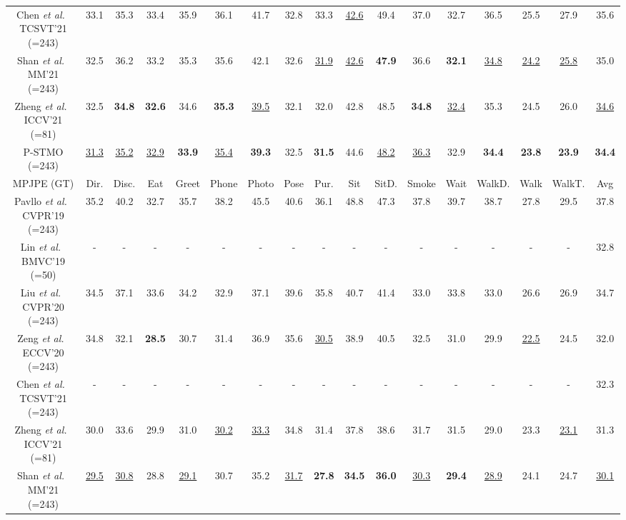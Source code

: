 \documentclass[]{llncs}
\begin{document}
\begin{table}[t]
\begin{center}
{\begin{tabular}{c|ccccccccccccccc|c}
Chen \textit{et al.}~\cite{chen2021anatomy} TCSVT'21 (=243)&
33.1&35.3&33.4&35.9&36.1&41.7&32.8&33.3&\underline{42.6}&49.4&37.0&32.7&36.5&25.5&27.9&35.6\\
Shan \textit{et al.}~\cite{shan2021improving} MM'21 (=243)&
32.5&36.2&33.2&35.3&35.6&42.1&32.6&\underline{31.9}&\underline{42.6}&\textbf{47.9}&36.6&\textbf{32.1}&\underline{34.8}&\underline{24.2}&\underline{25.8}&35.0\\
Zheng \textit{et al.}~\cite{zheng20213d} ICCV'21 (=81)&
32.5&\textbf{34.8}&\textbf{32.6}&34.6&\textbf{35.3}&\underline{39.5}&32.1&32.0&42.8&48.5&\textbf{34.8}&\underline{32.4}&35.3&24.5&26.0&\underline{34.6}\\

\noalign{\smallskip}
\hline
\noalign{\smallskip}
P-STMO (=243)  &
\underline{31.3}&\underline{35.2}&\underline{32.9}&\textbf{33.9}&\underline{35.4}&\textbf{39.3}&32.5&\textbf{31.5}&44.6&\underline{48.2}&\underline{36.3}&32.9&\textbf{34.4}&\textbf{23.8}&\textbf{23.9}&\textbf{34.4}\\
\noalign{\smallskip}
\hline
\hline
\noalign{\smallskip}
MPJPE (GT) & Dir. & Disc. & Eat & Greet & Phone & Photo & Pose & Pur. & Sit & SitD. & Smoke & Wait & WalkD. & Walk & WalkT. & Avg \\
\noalign{\smallskip}
\hline
\noalign{\smallskip}
Pavllo \textit{et al.}~\cite{pavllo20193d} CVPR'19 (=243) &35.2&40.2&32.7&35.7&38.2&45.5&40.6&36.1&48.8&47.3&37.8&39.7&38.7&27.8&29.5&37.8  \\
Lin \textit{et al.}~\cite{lin2019trajectory} BMVC'19 (=50)& -&-&-&-&-&-&-&-&-&-&-&-&-&-&-&32.8 \\
Liu \textit{et al.}~\cite{liu2020attention} CVPR'20 (=243) &34.5&37.1&33.6&34.2&32.9&37.1&39.6&35.8&40.7&41.4&33.0&33.8&33.0&26.6&26.9&34.7   \\
Zeng \textit{et al.}~\cite{zeng2020srnet} ECCV'20 (=243) &34.8&32.1&\textbf{28.5}&30.7&31.4&36.9&35.6&\underline{30.5}&38.9&40.5&32.5&31.0&29.9&\underline{22.5}&24.5&32.0   \\
Chen \textit{et al.}~\cite{chen2021anatomy} TCSVT'21 (=243)&-&-&-&-&-&-&-&-&-&-&-&-&-&-&-&32.3\\
Zheng \textit{et al.}~\cite{zheng20213d} ICCV'21 (=81)&
30.0&33.6&29.9&31.0&\underline{30.2}&\underline{33.3}&34.8&31.4&37.8&38.6&31.7&31.5&29.0&23.3&\underline{23.1}&31.3\\
Shan \textit{et al.}~\cite{shan2021improving} MM'21 (=243)&
\underline{29.5}&\underline{30.8}&28.8&\underline{29.1}&30.7&35.2&\underline{31.7}&\textbf{27.8}&\textbf{34.5}&\textbf{36.0}&\underline{30.3}&\textbf{29.4}&\underline{28.9}&24.1&24.7&\underline{30.1}\\

\end{tabular}}
\end{center}
\end{table}
\end{document}
